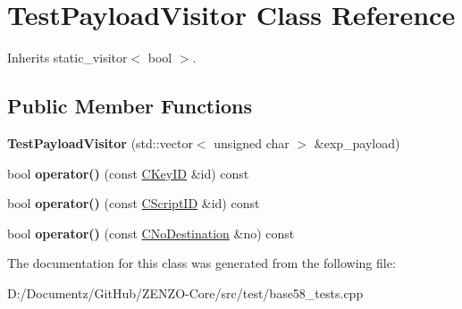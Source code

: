 \hypertarget{class_test_payload_visitor}{}\section{Test\+Payload\+Visitor Class Reference}
\label{class_test_payload_visitor}


Inherits static\+\_\+visitor$<$ bool $>$.

\subsection*{Public Member Functions}
\begin{DoxyCompactItemize}
\item 
\mbox{\label{class_test_payload_visitor_a8f963dfce22edb3c83c5712f4a9fa64d}} 
{\bfseries Test\+Payload\+Visitor} (std\+::vector$<$ unsigned char $>$ \&exp\+\_\+payload)
\item 
\mbox{\label{class_test_payload_visitor_a93c64602e0082662a5d03e4d7979b7e9}} 
bool {\bfseries operator()} (const \mbox{\hyperlink{class_c_key_i_d}{C\+Key\+ID}} \&id) const
\item 
\mbox{\label{class_test_payload_visitor_af0ba08e8ebf99e1997488e28463ee943}} 
bool {\bfseries operator()} (const \mbox{\hyperlink{class_c_script_i_d}{C\+Script\+ID}} \&id) const
\item 
\mbox{\label{class_test_payload_visitor_af0ed2b2fd03f94c8009713aabd0a8191}} 
bool {\bfseries operator()} (const \mbox{\hyperlink{class_c_no_destination}{C\+No\+Destination}} \&no) const
\end{DoxyCompactItemize}


The documentation for this class was generated from the following file\+:\begin{DoxyCompactItemize}
\item 
D\+:/\+Documentz/\+Git\+Hub/\+Z\+E\+N\+Z\+O-\/\+Core/src/test/base58\+\_\+tests.\+cpp\end{DoxyCompactItemize}
